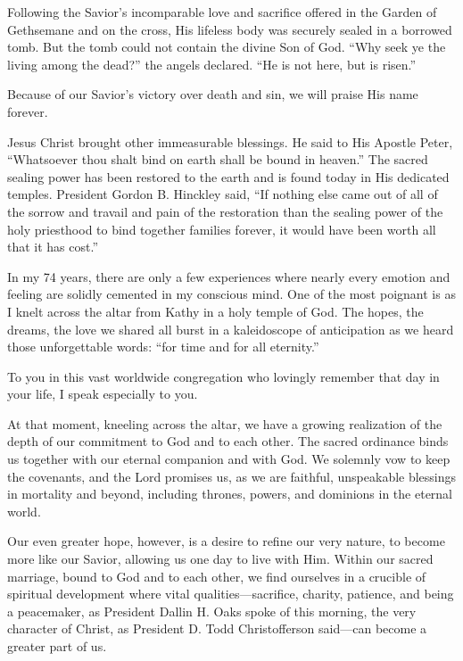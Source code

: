 \documentclass[letterpaper, 11pt]{report}
\newcommand{\intalkheader}[1]{
    \vspace{0.75em}
    \noindent{\normalsize\bfseries #1}
    \par\nopagebreak %
    \vspace{0.25em}
    \nopagebreak     %
}
\begin{document}
Following the Savior’s incomparable love and sacrifice offered in the Garden of Gethsemane and on the cross, His lifeless body was securely sealed in a borrowed tomb. But the tomb could not contain the divine Son of God. “Why seek ye the living among the dead?” the angels declared. “He is not here, but is risen.”

Because of our Savior’s victory over death and sin, we will praise His name forever.

Jesus Christ brought other immeasurable blessings. He said to His Apostle Peter, “Whatsoever thou shalt bind on earth shall be bound in heaven.” The sacred sealing power has been restored to the earth and is found today in His dedicated temples. President Gordon B. Hinckley said, “If nothing else came out of all of the sorrow and travail and pain of the restoration than the sealing power of the holy priesthood to bind together families forever, it would have been worth all that it has cost.”

\intalkheader{Kneeling at the Altar}

In my 74 years, there are only a few experiences where nearly every emotion and feeling are solidly cemented in my conscious mind. One of the most poignant is as I knelt across the altar from Kathy in a holy temple of God. The hopes, the dreams, the love we shared all burst in a kaleidoscope of anticipation as we heard those unforgettable words: “for time and for all eternity.”

To you in this vast worldwide congregation who lovingly remember that day in your life, I speak especially to you.

At that moment, kneeling across the altar, we have a growing realization of the depth of our commitment to God and to each other. The sacred ordinance binds us together with our eternal companion and with God. We solemnly vow to keep the covenants, and the Lord promises us, as we are faithful, unspeakable blessings in mortality and beyond, including thrones, powers, and dominions in the eternal world.

\intalkheader{Refining Our Nature}

Our even greater hope, however, is a desire to refine our very nature, to become more like our Savior, allowing us one day to live with Him. Within our sacred marriage, bound to God and to each other, we find ourselves in a crucible of spiritual development where vital qualities—sacrifice, charity, patience, and being a peacemaker, as President Dallin H. Oaks spoke of this morning, the very character of Christ, as President D. Todd Christofferson said—can become a greater part of us.
\end{document}

